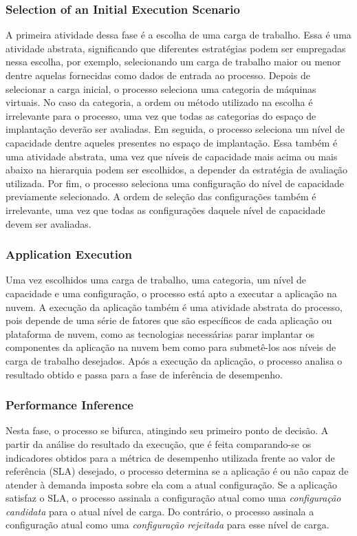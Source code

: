 \documentclass[10pt,conference,compsocconf]{IEEEtran}
\begin{document}
\subsubsection{Selection of an Initial Execution Scenario}

A primeira atividade dessa fase é a escolha de uma carga de trabalho. Essa é uma atividade abstrata, significando que 
diferentes estratégias podem ser empregadas nessa escolha, por exemplo,
selecionando um carga de trabalho maior ou menor dentre aquelas fornecidas como dados de entrada ao processo. Depois de selecionar a carga inicial, o processo seleciona uma categoria de máquinas virtuais. No caso da categoria, a ordem ou método utilizado na escolha é irrelevante para o processo, uma vez que todas as categorias do espaço de implantação deverão ser avaliadas. Em seguida, o processo seleciona um nível de capacidade dentre aqueles presentes no espaço de implantação. Essa também é uma atividade abstrata, uma vez que níveis de capacidade mais acima ou mais abaixo na hierarquia podem ser escolhidos, a depender da estratégia de avaliação utilizada. Por fim, o processo seleciona uma configuração do nível de capacidade previamente selecionado. A ordem de seleção das configurações também é irrelevante, uma vez que todas as configurações daquele nível de capacidade devem ser avaliadas. 

\subsubsection{Application Execution}

Uma vez escolhidos uma carga de trabalho, uma categoria, um nível de capacidade e uma configuração, o processo está apto a executar a aplicação na nuvem. A execução da aplicação também é uma atividade abstrata do processo, pois depende de uma série de fatores que são específicos de cada aplicação ou plataforma de nuvem, como as tecnologias necessárias parar implantar os componentes da aplicação na nuvem bem como para submetê-los aos níveis de carga de trabalho desejados.  Após a execução da aplicação, o processo analisa o resultado obtido e passa para a fase de inferência de desempenho.

\subsubsection{Performance Inference}

Nesta fase, o processo se bifurca, atingindo seu primeiro ponto de decisão. A partir da análise do resultado da execução, que é feita comparando-se os indicadores obtidos para a métrica de desempenho utilizada frente ao valor de referência (SLA) desejado, o processo determina se a aplicação é ou não capaz de atender à demanda imposta sobre ela com a atual configuração. Se a aplicação satisfaz o SLA, o processo assinala a configuração atual como uma {\em configuração candidata} para o atual nível de carga. Do contrário, o processo assinala a configuração atual como uma {\em configuração rejeitada} para esse nível de carga.
\end{document}
